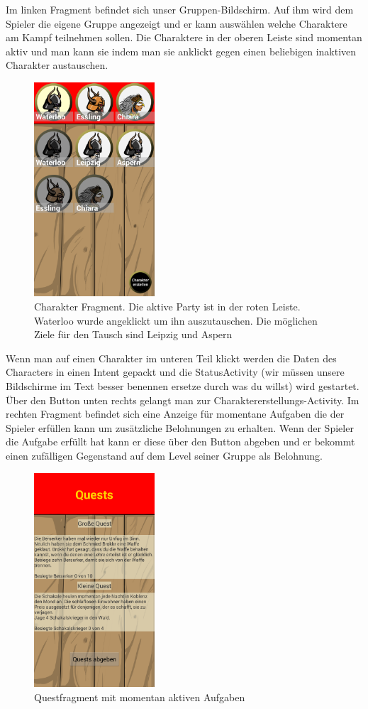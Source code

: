 \documentclass[extern,palatino]{cgBA}
\begin{document}
Im linken Fragment befindet sich unser Gruppen-Bildschirm. Auf ihm wird dem Spieler die eigene Gruppe angezeigt und er kann auswählen welche Charaktere am Kampf teilnehmen sollen. Die Charaktere in der oberen Leiste sind momentan aktiv und man kann sie indem man sie anklickt gegen einen beliebigen inaktiven Charakter austauschen.\begin{figure}[htb] 
	\centering
	\includegraphics[width=0.4\textwidth]{charfragment.png}
	\caption{Charakter Fragment. Die aktive Party ist in der roten Leiste. Waterloo wurde angeklickt um ihn auszutauschen. Die möglichen Ziele für den Tausch sind Leipzig und Aspern}
	\label{fig:Bild2}
\end{figure} 
Wenn man auf einen Charakter im unteren Teil klickt werden die Daten des Characters in einen Intent gepackt und die StatusActivity (wir müssen unsere Bildschirme im Text besser benennen ersetze durch was du willst) wird gestartet. Über den Button unten rechts gelangt man zur Charaktererstellungs-Activity.
\newpage
Im rechten Fragment befindet sich eine Anzeige für momentane Aufgaben die der Spieler erfüllen kann um zusätzliche Belohnungen zu erhalten. Wenn der Spieler die Aufgabe erfüllt hat kann er diese über den Button abgeben und er bekommt einen zufälligen Gegenstand auf dem Level seiner Gruppe als Belohnung.
\newpage
\begin{figure}[htb] 
	\centering
	\includegraphics[width=0.4\textwidth]{questfragment.png}
	\caption{Questfragment mit momentan aktiven Aufgaben}
	\label{fig:Bild3}
\end{figure} 
\end{document}
